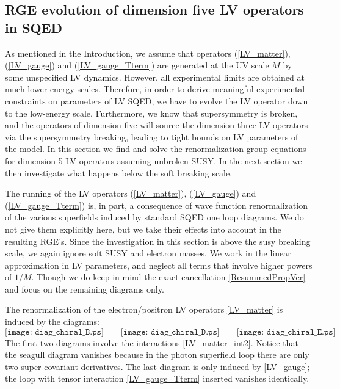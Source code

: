 \documentclass[12pt]{revtex4}
\begin{document}
\subsection{RGE evolution of dimension five LV operators in SQED}
\label{RGEvolution}




As mentioned in the Introduction, we assume that operators
(\ref{LV_matter}), (\ref{LV_gauge}) and (\ref{LV_gauge_Tterm})  
are generated at the UV scale $M$ by some unspecified LV dynamics. 
However, all experimental limits are obtained at much lower energy
scales. Therefore, in order to derive meaningful experimental
constraints on parameters of LV SQED, we have to evolve the LV
operator down to the low-energy scale. Furthermore, we know that
supersymmetry is broken, and the operators of dimension five will
source  the dimension three LV operators via the supersymmetry
breaking, leading to tight bounds on LV parameters of the model.
In this section we find and solve the renormalization group equations     
for dimension 5 LV operators assuming unbroken SUSY. In the next
section we then investigate what happens below the soft breaking
scale. 


The running of the LV operators (\ref{LV_matter}), (\ref{LV_gauge})
and (\ref{LV_gauge_Tterm}) is, in part, a consequence of wave
function renormalization of the various superfields induced by
standard SQED one loop diagrams. We do not give them explicitly here,
but we take their effects into account in the resulting RGE's. 
Since the investigation in this section is above the susy breaking
scale, we again ignore soft SUSY and electron masses. 
We work in the linear approximation in LV parameters, and
neglect all terms that involve higher powers of $1/M$. Though we do
keep in mind the exact cancellation \eqref{ResummedPropVer} 
and focus on the remaining diagrams only. 

The renormalization of the electron/positron LV operators
\eqref{LV_matter} is induced by the diagrams:  
\begin{equation}
\label{diag_LV_chiral}
\texttt{[image: diag\_chiral\_B.ps]}
\qquad 
\texttt{[image: diag\_chiral\_D.ps]}
\qquad 
\texttt{[image: diag\_chiral\_E.ps]}
\end{equation}
The first two diagrams involve the interactions
\eqref{LV_matter_int2}. Notice that the seagull diagram vanishes
because in the photon superfield loop there are only two super
covariant derivatives. The last diagram is only induced by
\eqref{LV_gauge}; the loop with tensor interaction
\eqref{LV_gauge_Tterm} inserted vanishes identically. 
\end{document}
